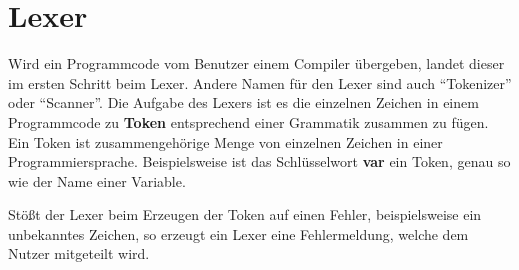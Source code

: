 \section{Lexer}
Wird ein Programmcode vom Benutzer einem Compiler übergeben, landet dieser im ersten Schritt beim Lexer. Andere Namen für den Lexer sind auch \enquote{Tokenizer} oder \enquote{Scanner}. Die Aufgabe des Lexers ist es die einzelnen Zeichen in einem Programmcode zu \textbf{Token} entsprechend einer Grammatik zusammen zu fügen. Ein Token ist zusammengehörige Menge von einzelnen Zeichen in einer Programmiersprache. Beispielsweise ist das Schlüsselwort \textbf{var} ein Token, genau so wie der Name einer Variable. 

Stößt der Lexer beim Erzeugen der Token auf einen Fehler, beispielsweise ein unbekanntes Zeichen, so erzeugt ein Lexer eine Fehlermeldung, welche dem Nutzer mitgeteilt wird.